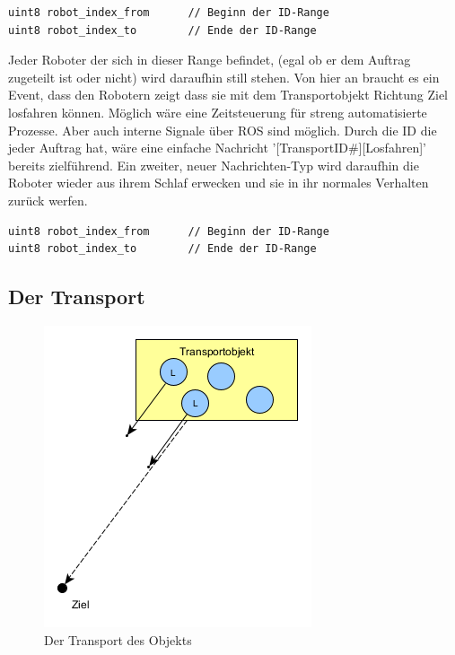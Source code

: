 \begin{lstlisting}[style=ros, title=Nachrichten-Typ: Robot\_Freeze.msg]
uint8 robot_index_from		// Beginn der ID-Range
uint8 robot_index_to		// Ende der ID-Range
\end{lstlisting}

Jeder Roboter der sich in dieser Range befindet, (egal ob er dem Auftrag zugeteilt ist oder nicht) wird daraufhin still stehen. Von hier an braucht es ein Event, dass den Robotern zeigt dass sie mit dem Transportobjekt Richtung Ziel losfahren können. Möglich wäre eine Zeitsteuerung für streng automatisierte Prozesse. Aber auch interne Signale über \ac{ROS} sind möglich. Durch die ID die jeder Auftrag hat, wäre eine einfache Nachricht '[TransportID\#][Losfahren]' bereits zielführend. Ein zweiter, neuer Nachrichten-Typ wird daraufhin die Roboter wieder aus ihrem Schlaf erwecken und sie in ihr normales Verhalten zurück werfen.

\begin{lstlisting}[style=ros, title=Nachrichten-Typ: Robot\_Continue.msg]
uint8 robot_index_from		// Beginn der ID-Range
uint8 robot_index_to		// Ende der ID-Range
\end{lstlisting}

\subsection*{Der Transport}

\begin{figure}
	\includegraphics[width=\pictureWidthSmall,keepaspectratio]{graphics/AlgorithmusTransport.png}
	\caption{Der Transport des Objekts}
	\label{pic:AlgorithmusTransport}
\end{figure}

